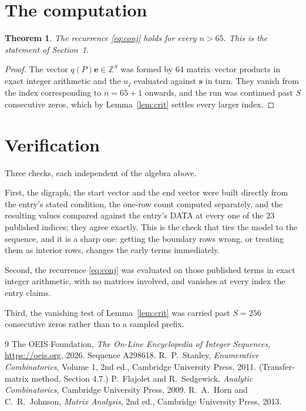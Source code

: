 \documentclass[11pt,a4paper]{article}
\theoremstyle{plain}
\newtheorem{theorem}{Theorem}
\theoremstyle{definition}
\begin{document}
\section{The computation}

\begin{theorem}
The recurrence \eqref{eq:conj} holds for every $n>65$. This is the statement of
Section~1.
\end{theorem}

\begin{proof}
The vector $q(P)\mathbf{e}\in\mathbb{Z}^{S}$ was formed by $64$ matrix--vector
products in exact integer arithmetic and the $u_j$ evaluated against $\mathbf{s}$ in turn.
They vanish from the index corresponding to $n=65+1$ onwards, and the run was continued
past $S$ consecutive zeros, which by Lemma~\ref{lem:crit} settles every larger index.
\end{proof}

\section{Verification}

Three checks, each independent of the algebra above.

First, the digraph, the start vector and the end vector were built directly from the
entry's stated condition, the one-row count computed separately, and the resulting values
compared against the entry's DATA at every one of the $23$ published indices; they
agree exactly. This is the check that ties the model to the sequence, and it is a sharp one:
getting the boundary rows wrong, or treating them as interior rows, changes the early terms
immediately.

Second, the recurrence \eqref{eq:conj} was evaluated on those published terms in exact
integer arithmetic, with no matrices involved, and vanishes at every index the entry claims.

Third, the vanishing test of Lemma~\ref{lem:crit} was carried past $S=256$ consecutive
zeros rather than to a sampled prefix.

\begin{thebibliography}{9}
 The OEIS Foundation, \emph{The On-Line Encyclopedia of Integer
Sequences}, \url{https://oeis.org}, 2026. Sequence A298618.
 R.~P.~Stanley, \emph{Enumerative Combinatorics}, Volume 1, 2nd ed.,
Cambridge University Press, 2011. (Transfer-matrix method, Section 4.7.)
 P.~Flajolet and R.~Sedgewick, \emph{Analytic Combinatorics}, Cambridge
University Press, 2009.
 R.~A.~Horn and C.~R.~Johnson, \emph{Matrix Analysis}, 2nd ed., Cambridge
University Press, 2013.
\end{thebibliography}
\end{document}

